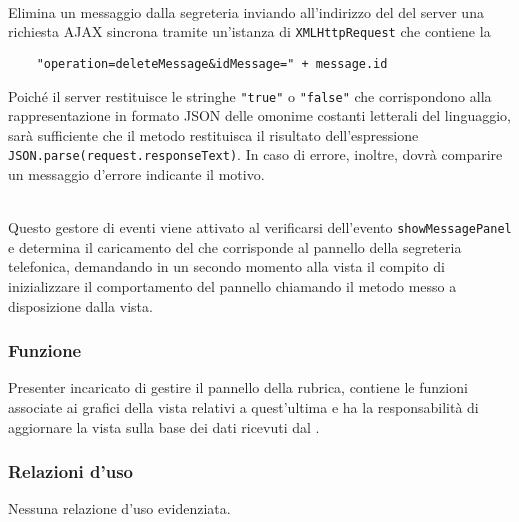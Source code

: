 \begin{description}
  \item{}\\
  Elimina un messaggio dalla segreteria inviando all'indirizzo del  del server una richiesta AJAX sincrona tramite un'istanza di \verb'XMLHttpRequest' che contiene la 
  \begin{verbatim}
    "operation=deleteMessage&idMessage=" + message.id
  \end{verbatim}
  
  Poiché il server restituisce le stringhe \verb'"true"' o \verb'"false"' che corrispondono alla rappresentazione in formato JSON delle omonime costanti letterali del linguaggio, sarà sufficiente che il metodo restituisca il risultato dell'espressione \verb'JSON.parse(request.responseText)'. In caso di errore, inoltre, dovrà comparire un messaggio d'errore indicante il motivo.
  
  \item{}\\
  Questo gestore di eventi viene attivato al verificarsi dell'evento \verb'showMessagePanel' e determina il caricamento del  che corrisponde al pannello della segreteria telefonica, demandando in un secondo momento alla vista il compito di inizializzare il comportamento del pannello chiamando il metodo  messo a disposizione dalla vista.
  
\end{description}



\subsubsection*{Funzione}
Presenter incaricato di gestire il pannello della rubrica, contiene le funzioni associate ai  grafici della vista relativi a quest'ultima e ha la responsabilità di aggiornare la vista sulla base dei dati ricevuti dal .

\subsubsection*{Relazioni d'uso}
Nessuna relazione d'uso evidenziata.


